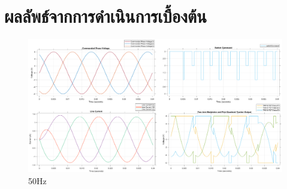 \documentclass[11pt,a4paper]{article}
\begin{document}
\section{ผลลัพธ์จากการดำเนินการเบื้องต้น}
\begin{figure}[h!]
    \centering
    \includegraphics[width=\textwidth]{VSI_6V_50Hz_3Ohm_10mH.eps}
    \caption{50Hz}

\end{figure}





\end{document}
